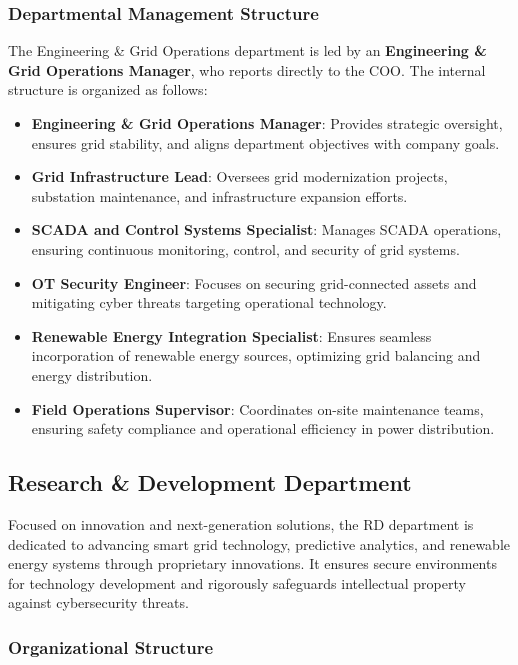 \subsubsection{Departmental Management Structure}

The Engineering \& Grid Operations department is led by an \textbf{Engineering \& Grid Operations Manager}, who reports directly to the \ac{COO}. The internal structure is organized as follows:

\begin{itemize}
    \item \textbf{Engineering \& Grid Operations Manager}: Provides strategic oversight, ensures grid stability, and aligns department objectives with company goals.
    \item \textbf{Grid Infrastructure Lead}: Oversees grid modernization projects, substation maintenance, and infrastructure expansion efforts.
    \item \textbf{SCADA and Control Systems Specialist}: Manages SCADA operations, ensuring continuous monitoring, control, and security of grid systems.
    \item \textbf{OT Security Engineer}: Focuses on securing grid-connected assets and mitigating cyber threats targeting operational technology.
    \item \textbf{Renewable Energy Integration Specialist}: Ensures seamless incorporation of renewable energy sources, optimizing grid balancing and energy distribution.
    \item \textbf{Field Operations Supervisor}: Coordinates on-site maintenance teams, ensuring safety compliance and operational efficiency in power distribution.
\end{itemize}

\subsection{Research \& Development Department}
Focused on innovation and next-generation solutions, the \ac{RD} department is dedicated to advancing smart grid technology, predictive analytics, and renewable energy systems through proprietary innovations.
It ensures secure environments for technology development and rigorously safeguards intellectual property against cybersecurity threats.

\subsubsection{Organizational Structure}

